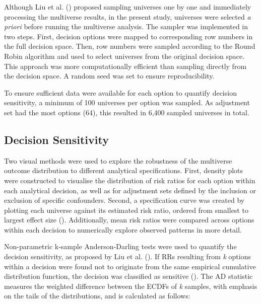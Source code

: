 \documentclass[
  man,
  floatsintext,
  longtable,
  nolmodern,
  notxfonts,
  notimes,
  colorlinks=true,linkcolor=blue,citecolor=blue,urlcolor=blue]{apa7}
\begin{document}
Although Liu et al. ()
proposed sampling universes one by one and immediately processing the
multiverse results, in the present study, universes were selected
\emph{a priori} before running the multiverse analysis. The sampler was
implemented in two steps. First, decision options were mapped to
corresponding row numbers in the full decision space. Then, row numbers
were sampled according to the Round Robin algorithm and used to select
universes from the original decision space. This approach was more
computationally efficient than sampling directly from the decision
space. A random seed was set to ensure reproducibility.

To ensure sufficient data were available for each option to quantify
decision sensitivity, a minimum of 100 universes per option was sampled.
As adjustment set had the most options (64), this resulted in 6,400
sampled universes in total.

\subsection{Decision Sensitivity}\label{decision-sensitivity}

Two visual methods were used to explore the robustness of the multiverse
outcome distribution to different analytical specifications. First,
density plots were constructed to visualise the distribution of risk
ratios for each option within each analytical decision, as well as for
adjustment sets defined by the inclusion or exclusion of specific
confounders. Second, a specification curve was created by plotting each
universe against its estimated risk ratio, ordered from smallest to
largest effect size
().
Additionally, mean risk ratios were compared across options within each
decision to numerically explore observed patterns in more detail.

Non-parametric k-sample Anderson-Darling tests were used to quantify the
decision sensitivity, as proposed by Liu et al.
(). If RRs resulting from
\emph{k} options within a decision were found not to originate from the
same empirical cumulative distribution function, the decision was
classified as sensitive (). The AD statistic measures the weighted difference
between the ECDFs of \emph{k} samples, with emphasis on the tails of the
distributions, and is calculated as follows:
\end{document}

